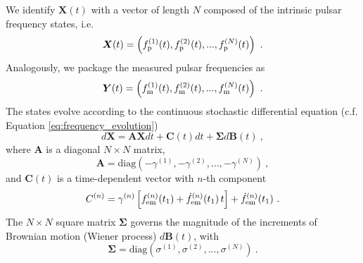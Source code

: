 \documentclass[fleqn,usenatbib,useAMS]{mnras}
\begin{document}
We identify $\boldsymbol{X}(t)$ with a vector of length $N$ composed of the intrinsic pulsar frequency states, i.e. 
\begin{equation}
	\boldsymbol{X}(t) = \left(f_{\rm p}^{(1)}(t), f_{\rm p}^{(2)}(t), ..., f_{\rm p}^{(N)}(t)\right) \ .
\end{equation}
Analogously,  we package the measured pulsar frequencies as
\begin{equation}
	\boldsymbol{Y}(t) = \left(f_{\rm m}^{(1)}(t), f_{\rm m}^{(2)}(t), ..., f_{\rm m}^{(N)}(t) \right) \ .
\end{equation}
The states evolve according to the continuous stochastic differential equation (c.f. Equation \eqref{eq:frequency_evolution})
\begin{equation}
	d \boldsymbol{X} = \boldsymbol{A} \boldsymbol{X} dt + \boldsymbol{C}(t) dt + \boldsymbol{\Sigma} d \boldsymbol{B}(t) \ , \label{eq:kalmn2}
\end{equation}
where $\boldsymbol{A}$ is a diagonal $N \times N$ matrix,
\begin{equation}
	\boldsymbol{A} = \text{diag} \left(-\gamma^{(1)}, -\gamma^{(2)}, ..., -\gamma^{(N)}\right) \ ,
\end{equation}
and $\boldsymbol{C}(t)$ is a time-dependent vector with $n$-th component
\begin{equation}
	C^{(n)} =\gamma^{(n)} \left[ f^{(n)} _{\rm em} (t_1) + \dot{f}^{(n)} _{\rm em}(t_1) \, t \right] +  \dot{f}^{(n)} _{\rm em}(t_1)\ .
\end{equation}
The $N \times N$ square matrix $\boldsymbol{\Sigma}$  governs the magnitude of the increments of Brownian motion (Wiener process) $d\boldsymbol{B}(t)$, with
\begin{equation}
	\boldsymbol{\Sigma} = \text{diag} \left(\sigma^{(1)}, \sigma^{(2)}, ..., \sigma^{(N)}\right) \ .
\end{equation}
\end{document}
